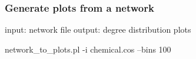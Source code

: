 \subsubsection{Generate plots from a network}

\begin{boxedverbatim}
 input: network file 
 output: degree distribution plots 

 network_to_plots.pl -i chemical.cos --bins 100
\end{boxedverbatim}

